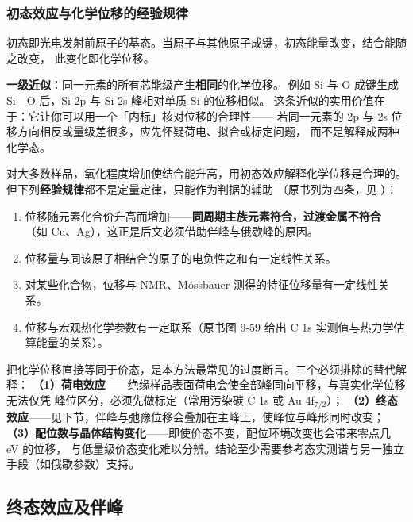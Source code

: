 \subsubsection{初态效应与化学位移的经验规律}

初态即光电发射前原子的基态。当原子与其他原子成键，初态能量改变，结合能随之改变，
此变化即化学位移。

\begin{keycond}
\textbf{一级近似}：同一元素的所有芯能级产生\textbf{相同}的化学位移。
例如 Si 与 O 成键生成 Si—O 后，Si 2p 与 Si 2s 峰相对单质 Si 的位移相似。
这条近似的实用价值在于：它让你可以用一个「内标」核对位移的合理性——
若同一元素的 2p 与 2s 位移方向相反或量级差很多，应先怀疑荷电、拟合或标定问题，
而不是解释成两种化学态。
\end{keycond}

对大多数样品，氧化程度增加使结合能升高，用初态效应解释化学位移是合理的。
但下列\textbf{经验规律}都不是定量定律，只能作为判据的辅助
（原书列为四条，见 ）：

\begin{enumerate}
\item 位移随元素化合价升高而增加——\textbf{同周期主族元素符合，过渡金属不符合}
（如 Cu、Ag），这正是后文必须借助伴峰与俄歇峰的原因。
\item 位移量与同该原子相结合的原子的电负性之和有一定线性关系。
\item 对某些化合物，位移与 NMR、Mössbauer 测得的特征位移量有一定线性关系。
\item 位移与宏观热化学参数有一定联系（原书图 9-59 给出 C 1s 实测值与热力学估算能量的关系）。
\end{enumerate}

\begin{pitfall}
把化学位移直接等同于价态，是本方法最常见的过度断言。三个必须排除的替代解释：
\textbf{（1）荷电效应}——绝缘样品表面荷电会使全部峰同向平移，与真实化学位移无法仅凭
峰位区分，必须先做标定（常用污染碳 C 1s 或 Au 4f$_{7/2}$）；
\textbf{（2）终态效应}——见下节，伴峰与弛豫位移会叠加在主峰上，使峰位与峰形同时改变；
\textbf{（3）配位数与晶体结构变化}——即使价态不变，配位环境改变也会带来零点几 eV 的位移，
与低量级价态变化难以分辨。结论至少需要参考态实测谱与另一独立手段（如俄歇参数）支持。
\end{pitfall}

\subsection{终态效应及伴峰}
\label{sec:ch09-satellites}


